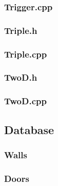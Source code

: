 \documentclass{article}
\begin{document}
\subsubsection{Trigger.cpp}
	
	 				
\subsubsection{Triple.h}
	
	 				
\subsubsection{Triple.cpp}
	
	 				
\subsubsection{TwoD.h}
	

\subsubsection{TwoD.cpp}	
	

\subsection{Database} \label{subsec:database}
	
\subsubsection{Walls}

\tiny{}

\setlength{\tabcolsep}{2.5pt}

\small{}
\subsubsection{Doors}
\end{document}
